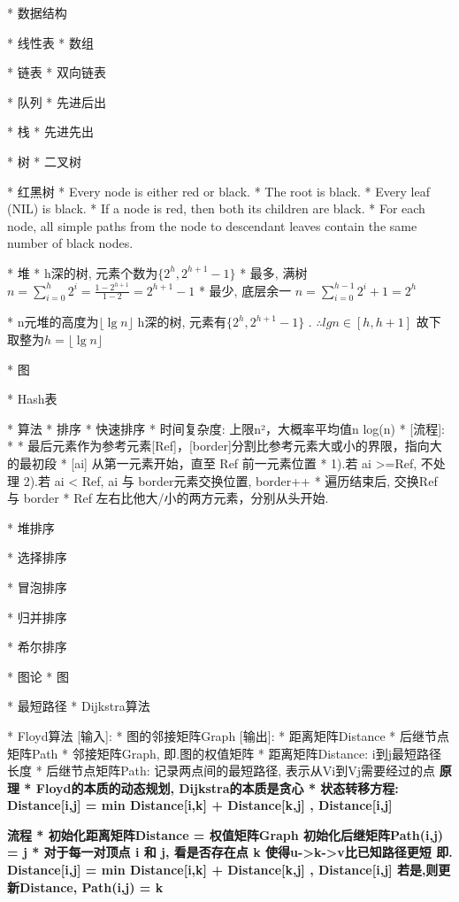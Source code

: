 
* 数据结构

	* 线性表
		* 数组

		* 链表
			* 双向链表

		* 队列
			* 先进后出

		* 栈
			* 先进先出

	* 树
		* 二叉树

		* 红黑树
			\Property
				* Every node is either red or black.
				* The root is black.
				* Every leaf (NIL) is black.
				* If a node is red, then both its children are black.
				* For each node, all simple paths from the node to descendant leaves contain the same number of black nodes.

		* 堆
			\Property
				* h深的树, 元素个数为$\{ 2^h, 2^{h+1} - 1 \}$ 
					\Proof
						* 最多, 满树
						$n = \sum_{i=0}^h 2^i = \frac{1 - 2^{h+1}}{1 - 2} = 2^{h+1} - 1$
						* 最少, 底层余一
						$n = \sum_{i=0}^{h-1} 2^i + 1 = 2^h$

				* n元堆的高度为$⌊\lg n⌋$
					\Proof
						h深的树, 元素有$\{ 2^h, 2^{h+1} - 1 \}$
						. $∴ lg n \in [h, h + 1]$
						故下取整为$ h = ⌊\lg n⌋$

	* 图

	* Hash表


* 算法
	* 排序
		* 快速排序
			\Property
				* 时间复杂度: 上限n²，大概率平均值n log(n)
				*	[流程]: 
				*		* 最后元素作为参考元素[Ref]，[border]分割比参考元素大或小的界限，指向大的最初段
						* [ai] 从第一元素开始，直至 Ref 前一元素位置
						*	1).若 ai >=Ref, 不处理
							2).若 ai < Ref, 
								ai 与 border元素交换位置, border++
						* 遍历结束后, 交换Ref 与 border
						* Ref 左右比他大/小的两方元素，分别从头开始. 
			
		* 堆排序

		* 选择排序

		* 冒泡排序

		* 归并排序

		* 希尔排序

	* 图论
		* 图

		* 最短路径
			* Dijkstra算法

			* Floyd算法
				[输入]:	* 图的邻接矩阵Graph
				[输出]: * 距离矩阵Distance	* 后继节点矩阵Path
					* 邻接矩阵Graph, 即.图的权值矩阵
					* 距离矩阵Distance: i到j最短路径长度
					* 后继节点矩阵Path: 记录两点间的最短路径, 表示从Vi到Vj需要经过的点
				\bf{原理}
					* Floyd的本质的动态规划, Dijkstra的本质是贪心
					* 状态转移方程:
						Distance[i,j] = min{ Distance[i,k] + Distance[k,j] , Distance[i,j] }

				\bf{流程}
					* 初始化距离矩阵Distance = 权值矩阵Graph
						初始化后继矩阵Path(i,j) = j
					* 对于每一对顶点 i 和 j, 看是否存在点 k 使得u->k->v比已知路径更短
							即. Distance[i,j] = min{ Distance[i,k] + Distance[k,j] , Distance[i,j] }
						若是,则更新Distance, Path(i,j) = k
				
